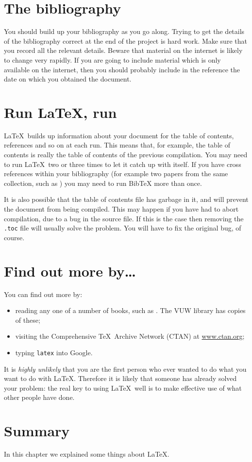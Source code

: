 \section{The bibliography}

You should build up your bibliography as you go along.  Trying to get 
the details of the bibliography correct at the end of the project is 
hard work. Make sure that you record all the relevant details. Beware 
that material on the internet is likely to change very rapidly. If you 
are going to include material which is only available on the internet, 
then you should probably include in the reference the date on which 
you obtained the document.

\section{Run \LaTeX, run}

\LaTeX\ builds up information about your document for the table of 
contents, references and so on at each run. This means that, for 
example, the table 
of contents is really the table of contents of the previous 
compilation. You may need to run \LaTeX\ two or three times to let it 
catch up with itself. If you have cross references within your 
bibliography (for example two papers from the same collection, such 
as \cite{Dum93a,Dum93b}) you may need to run 
BibTeX more than once. 

It is also possible that the table of contents file has garbage in 
it, and will prevent the document from being compiled. This may 
happen if you have had to abort compilation, due to a bug in the 
source file. If this is the case then removing the \texttt{.toc} file 
will usually solve the problem. You will have to fix the original 
bug, of course.


\section{Find out more by\ldots}
You can find out more by:
\begin{itemize}
\item reading any one of a number of books, such as \cite{GMS94,Lam94}. The 
VUW library has copies of these;
\item visiting  the Comprehensive \TeX\ Archive Network (CTAN) at 
\url{www.ctan.org};
\item typing \texttt{latex} into Google.
\end{itemize}

It is \emph{highly unlikely} that you are the first person who ever 
wanted to do what you want to do with \LaTeX. Therefore it is likely 
that someone has already solved your problem: the real key to using  
\LaTeX\ well is to make effective use of what other people have done.

\section{Summary}
In this chapter we explained some things about \LaTeX.